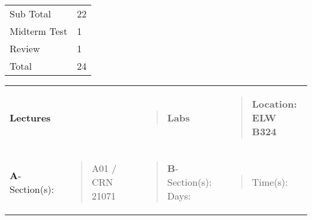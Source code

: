 \begin{longtable}[]{@{}ll@{}}
\toprule
Sub Total & 22\tabularnewline
Midterm Test & 1\tabularnewline
Review & 1\tabularnewline
Total & 24\tabularnewline
\bottomrule
\end{longtable}

\begin{longtable}[]{@{}lllll@{}}
\toprule
\begin{minipage}[t]{0.19\columnwidth}\raggedright\strut
\textbf{Lectures}\strut
\end{minipage} & \begin{minipage}[t]{0.19\columnwidth}\raggedright\strut
\strut
\end{minipage} & \begin{minipage}[t]{0.19\columnwidth}\raggedright\strut
\strut
\end{minipage} & \begin{minipage}[t]{0.19\columnwidth}\raggedright\strut
\begin{quote}
\textbf{Labs}
\end{quote}\strut
\end{minipage} & \begin{minipage}[t]{0.19\columnwidth}\raggedright\strut
\begin{quote}
\textbf{Location: ELW B324}
\end{quote}\strut
\end{minipage}\tabularnewline
\begin{minipage}[t]{0.19\columnwidth}\raggedright\strut
\textbf{A}-Section(s):\strut
\end{minipage} & \begin{minipage}[t]{0.19\columnwidth}\raggedright\strut
\begin{quote}
A01 / CRN 21071
\end{quote}\strut
\end{minipage} & \begin{minipage}[t]{0.19\columnwidth}\raggedright\strut
\strut
\end{minipage} & \begin{minipage}[t]{0.19\columnwidth}\raggedright\strut
\begin{quote}
\textbf{B}-Section(s): Days:
\end{quote}\strut
\end{minipage} & \begin{minipage}[t]{0.19\columnwidth}\raggedright\strut
\begin{quote}
Time(s):
\end{quote}\strut

\end{minipage}
\end{longtable}
